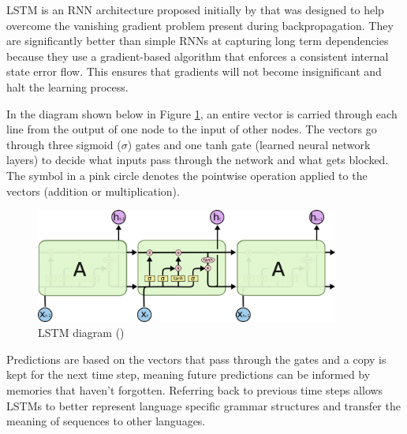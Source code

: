 \acrfull{LSTM} is an \acrshort{RNN} architecture proposed initially by \cite{hochreiter_long_1997} that was designed to help overcome the vanishing gradient problem present during backpropagation. They are significantly better than simple \acrshort{RNN}s at capturing long term dependencies because they use a gradient-based algorithm that enforces a consistent internal state error flow. This ensures that gradients will not become insignificant and halt the learning process.

In the diagram shown below in Figure \ref{fig:rnn_lstm}, an entire vector is carried through each line from the output of one node to the input of other nodes. The vectors go through three sigmoid ($\sigma$) gates and one tanh gate (learned neural network layers) to decide what inputs pass through the network and what gets blocked. The symbol in a pink circle denotes the pointwise operation applied to the vectors (addition or multiplication).

\begin{figure}[ht!]
\centering
\includegraphics[width=0.89\textwidth]{media/literature/machine_learning/ml_rnn_lstm.png}
\caption[Diagram of Long Short Term Memory]{\acrlong{LSTM} diagram (\cite{colah_lstm_2019})}
\label{fig:rnn_lstm}
\end{figure}

Predictions are based on the vectors that pass through the gates and a copy is kept for the next time step, meaning future predictions can be informed by memories that haven't forgotten. Referring back to previous time steps allows \acrshort{LSTM}s to better represent language specific grammar structures and transfer the meaning of sequences to other languages.







